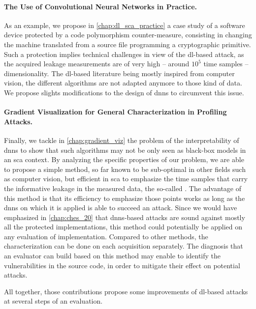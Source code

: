\paragraph{The Use of Convolutional Neural Networks in Practice.}
As an example, we propose in \autoref{chap:dl_sca_practice} a case study of a software device protected by a code polymorphism counter-measure, consisting in changing the machine translated from a source file programming a cryptographic primitive.
Such a protection implies technical challenges in view of the \gls{dl}-based attack, as the acquired leakage measurements are of very high -- \ie{} around \(10^5\) time samples -- dimensionality.
The \gls{dl}-based literature being mostly inspired from computer vision, the different algorithms are not adapted anymore to those kind of data.
We propose slights modifications to the design of \glspl{dnn} to circumvent this issue.

\paragraph{Gradient Visualization for General Characterization in Profiling Attacks.}
Finally, we tackle in \autoref{chap:gradient_viz} the problem of the interpretability of \glspl{dnn} to show that such algorithms may not be only seen as black-box models in an \gls{sca} context.
By analyzing the specific properties of our problem, we are able to propose a simple method, so far known to be sub-optimal in other fields such as computer vision, but efficient in \gls{sca} to emphasize the time samples that carry the informative leakage in the measured data, the so-called .
The advantage of this method is that its efficiency to emphasize those points works as long as the \glspl{dnn} on which it is applied is able to succeed an attack.
Since we would have emphasized in \autoref{chap:ches_20} that \glspl{dnn}-based attacks are sound against mostly all the protected implementations, this method could potentially be applied on any evaluation of implementation.
Compared to other methods, the characterization can be done on each acquisition separately.
The diagnosis that an evaluator can build based on this method may enable to identify the vulnerabilities in the source code, in order to mitigate their effect on potential attacks.

All together, those contributions propose some improvements of \gls{dl}-based attacks at several steps of an evaluation.
